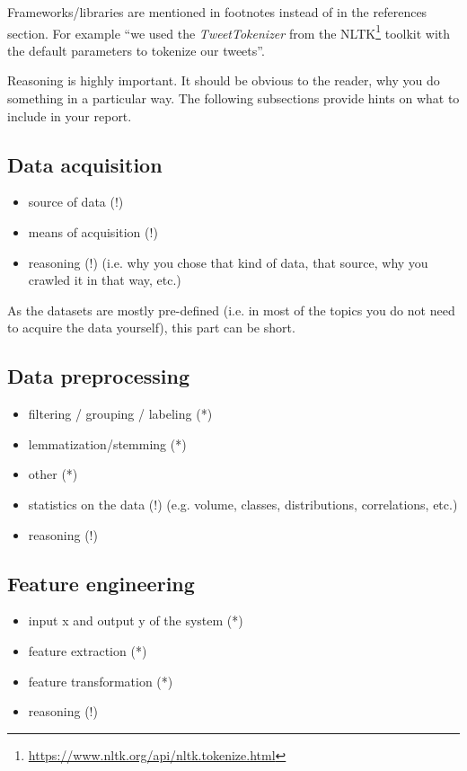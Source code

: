 \documentclass[sigconf]{acmart}
\begin{document}
Frameworks/libraries are mentioned in footnotes instead of in the references section.
For example ``we used the \emph{TweetTokenizer} from the NLTK\footnote{\url{https://www.nltk.org/api/nltk.tokenize.html}} toolkit with the default parameters to tokenize our tweets''.

Reasoning is highly important. 
It should be obvious to the reader, why you do something in a particular way.
The following subsections provide hints on what to include in your report.

\begin{center}
 \noindent{}

\end{center}

\subsection{Data acquisition}
\begin{itemize}
 \item source of data (!)
 \item means of acquisition (!)
 \item reasoning (!) (i.e. why you chose that kind of data, that source, why you crawled it in that way, etc.)
\end{itemize}
As the datasets are mostly pre-defined (i.e. in most of the topics you do not need to acquire the data yourself), this part can be short.

\subsection{Data preprocessing}
\begin{itemize}
 \item filtering / grouping / labeling (*)
 \item lemmatization/stemming (*)
 \item other (*)
 \item statistics on the data (!) (e.g. volume, classes, distributions, correlations, etc.)
 \item reasoning (!)
\end{itemize}

\subsection{Feature engineering}
\begin{itemize}
 \item input x and output y of the system (*)
 \item feature extraction (*)
 \item feature transformation (*)
 \item reasoning (!)
\end{itemize}
\end{document}

